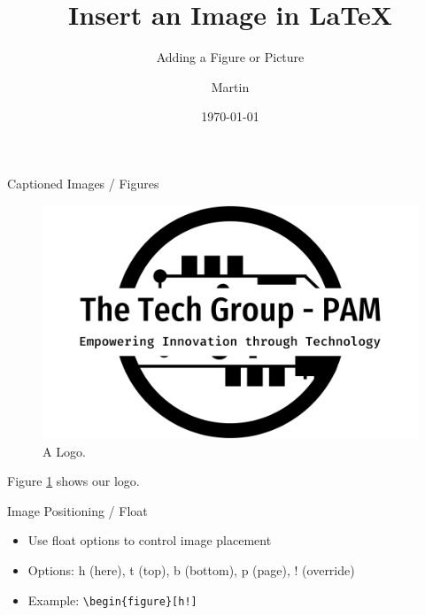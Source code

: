 \documentclass{beamer}
\title{Insert an Image in LaTeX}
\subtitle{Adding a Figure or Picture}
\author{Martin}
\date{\today}
\begin{document}
\begin{frame}
  \titlepage
\end{frame}

\begin{frame}{Captioned Images / Figures}
  \begin{figure}
    \includegraphics[width=\linewidth]{../images/the-tech-group-pam-high-resolution-logo-black-on-transparent-background_01.png}
    \caption{A Logo.}
    \label{fig:logo1}
  \end{figure}
  Figure \ref{fig:logo1} shows our logo.
\end{frame}

\begin{frame}{Image Positioning / Float}
  \begin{figure}[h!]
  \end{figure}
  \begin{itemize}
    \item Use float options to control image placement
    \item Options: h (here), t (top), b (bottom), p (page), ! (override)
    \item Example: \texttt{\textbackslash{}begin\{figure\}[h!]}
  \end{itemize}
\end{frame}
\end{document}
